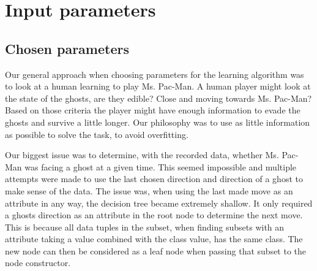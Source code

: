 \documentclass{article}
\begin{document}
\fi %
\section{Input parameters}
%

    \subsection{Chosen parameters}
    Our general approach when choosing parameters for the learning algorithm was to look at a human learning to play Ms. Pac-Man. A human player might look at the state of the ghosts, are they edible? Close and moving towards Ms. Pac-Man? Based on those criteria the player might have enough information to evade the ghosts and survive a little longer. Our philosophy was to use as little information as possible to solve the task, to avoid overfitting.

    Our biggest issue was to determine, with the recorded data, whether Ms. Pac-Man was facing a ghost at a given time. This seemed impossible and multiple attempts were made to use the last chosen direction and direction of a ghost to make sense of the data. The issue was, when using the last made move as an attribute in any way, the decision tree became extremely shallow. It only required a ghosts direction as an attribute in the root node to determine the next move.
    This is because all data tuples in the subset, when finding subsets with an attribute taking a value combined with the class value, has the same class.
    The new node can then be considered as a leaf node when passing that subset to the node constructor.
\end{document}
